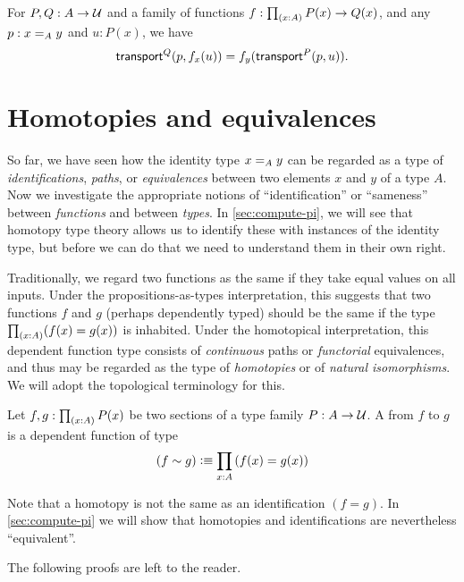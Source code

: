 \begin{lem}\label{thm:ap-transport}
  For $P,Q:A\to \type$ and a family of functions $f:\prd{x:A} P(x)\to Q(x)$, and any $p:\id[A]xy$ and $u:P(x)$, we have
  \[ \transfib{Q}{p}{f_x(u)} = f_y(\transfib{P}{p}{u}). \]
\end{lem}

%

\section{Homotopies and equivalences}
\label{sec:basics-equivalences}

So far, we have seen how the identity type $\id[A]xy$ can be regarded as a type of \emph{identifications}, \emph{paths}, or \emph{equivalences} between two elements $x$ and $y$ of a type $A$.
Now we investigate the appropriate notions of ``identification'' or ``sameness'' between \emph{functions} and between \emph{types}.
In \autoref{sec:compute-pi}, we will see that homotopy type theory allows us to identify these with instances of the identity type, but before we can do that we need to understand them in their own right.

Traditionally, we regard two functions as the same if they take equal values on all inputs.
Under the propositions-as-types interpretation, this suggests that two functions $f$ and $g$ (perhaps dependently typed) should be the same if the type $\prd{x:A} (f(x)=g(x))$ is inhabited.
Under the homotopical interpretation, this dependent function type consists of \emph{continuous} paths or \emph{functorial} equivalences, and thus may be regarded as the type of \emph{homotopies} or of \emph{natural isomorphisms}.
We will adopt the topological terminology for this.

\begin{defn} \label{defn:homotopy}
  Let $f,g:\prd{x:A} P(x)$ be two sections of a type family $P:A\to\type$.
  A %
  from $f$ to $g$ is a dependent function of type
  \begin{equation*}
    (f\htpy g) \defeq \prd{x:A} (f(x)=g(x))
  \end{equation*}
\end{defn}

Note that a homotopy is not the same as an identification $(f=g)$.
In \autoref{sec:compute-pi} we will show that homotopies and identifications are nevertheless ``equivalent''.

The following proofs are left to the reader.


